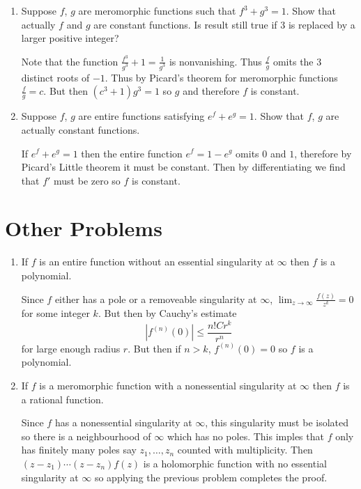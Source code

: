\documentclass[letterpaper, 12pt]{article}
\begin{document}
\begin{enumerate}
    \item
    Suppose \(f\), \(g\) are meromorphic functions such that \(f^3 + g^3 = 1\). Show that actually \(f\) and \(g\) are constant functions. Is result still true if 3 is replaced by a larger positive integer?
    \begin{solution}
        Note that the function \(\frac{f^3}{g^3} + 1 =  \frac{1}{g^3}\) is nonvanishing. Thus \(\frac{f}{g}\) omits the \(3\) distinct roots of \(-1\). Thus by Picard's theorem for meromorphic functions \(\frac{f}{g} = c\). But then \((c^3 +1)g^3 = 1\) so \(g\) and therefore \(f\) is constant. 
    \end{solution}

    \item
    Suppose \(f\), \(g\) are entire functions satisfying \(e^f + e^g = 1\). Show that \(f\), \(g\) are actually constant functions. 
    \begin{solution}
        If \(e^f + e^g = 1\) then the entire function \(e^f = 1 - e^g\) omits \(0\) and \(1\), therefore by Picard's Little theorem it must be constant. Then by differentiating we find that \(f'\) must be zero so \(f\) is constant.
    \end{solution}
\end{enumerate}

\section{Other Problems}\label{otherprob}
\begin{enumerate}
    \item
    If \(f\) is an entire function without an  essential singularity at \(\infty\) then \(f\) is a polynomial.
    \begin{solution}
        Since \(f\) either has a pole or a removeable singularity at \(\infty\), \(\lim_{z \to \infty} \frac{f(z)}{z^k} = 0\) for some integer \(k\). But then by Cauchy's estimate 
        \[
            |f^{(n)}(0)| \leq \frac{n!Cr^k }{r^n}
        \]
        for large enough radius \(r\). But then if \(n > k\), \(f^{(n)} (0) = 0\) so \(f\) is a polynomial.
    \end{solution}

    \item
    If \(f\) is a meromorphic function with a nonessential singularity at \(\infty\) then \(f\) is a rational function.
    \begin{solution}
        Since \(f\) has a nonessential singularity at \(\infty\), this singularity must be isolated so there is a neighbourhood of \(\infty\) which has no poles. This imples that \(f\) only has finitely many poles say \(z_1, \dots, z_n\) counted with multiplicity. Then \((z-z_1) \cdots (z-z_n) f(z)\) is a holomorphic function with no essential singularity at \(\infty\) so applying the previous problem completes the proof.
    \end{solution}

\end{enumerate}
\end{document}
